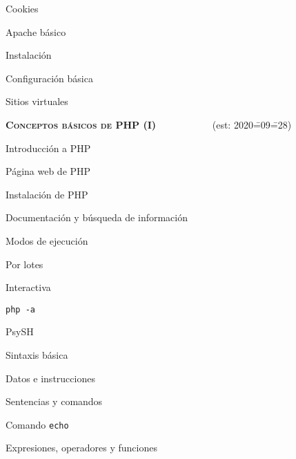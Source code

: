 \begin{longenum}
\begin{longenum}
\begin{longenum}
\begin{longenum}
            \end{longenum}
            \item Cookies
        \end{longenum}
        \item Apache básico \opcional\
        \begin{longenum}
            \item Instalación
            \item Configuración básica
            \item Sitios virtuales
        \end{longenum}
    \end{longenum}
    \item \textbf{\textsc{Conceptos básicos de PHP (I)}} \ \ \ \ \ \ \ \ \ \ \ (est: 2020\==09\==28)
    \begin{longenum}
        \item Introducción a PHP
        \begin{longenum}
            \item Página web de PHP
            \item Instalación de PHP
            \item Documentación y búsqueda de información
            \item Modos de ejecución
            \begin{longenum}
                \item Por lotes
                \item Interactiva
                \begin{longenum}
                    \item \texttt{php -a}
                    \item PsySH
                \end{longenum}
            \end{longenum}
        \end{longenum}
        \item Sintaxis básica
        \begin{longenum}
            \item Datos e instrucciones
            \item Sentencias y comandos
            \begin{longenum}
                \item Comando \texttt{echo}
            \end{longenum}
            \item Expresiones, operadores y funciones

\end{longenum}
\end{longenum}
\end{longenum}
